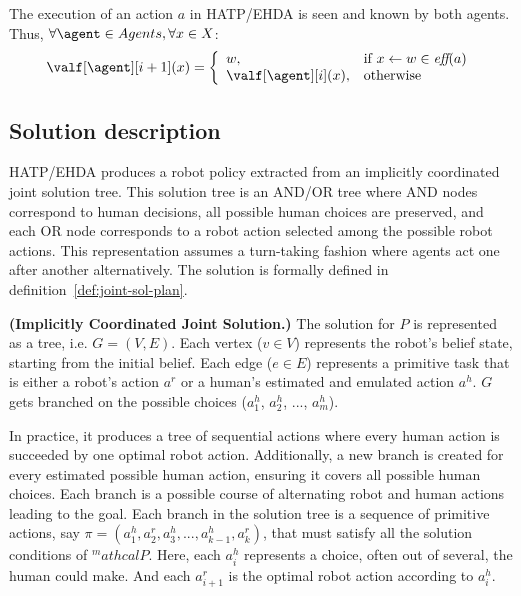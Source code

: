 The execution of an action $a$ in HATP/EHDA is seen and known by both agents. Thus, $\forall \agent \in Agents, \forall x \in X$: 
\begin{equation}
    \valf[\agent][i+1](x) = \left\{ 
    \begin{array}{ll}
        w, & \mbox{if} ~ x \leftarrow w \in \textit{eff}(a)   \\ 
        \valf[\agent][i](x), & \mbox{otherwise}
    \end{array}\right.
\end{equation}


\subsection*{Solution description}

HATP/EHDA produces a robot policy extracted from an implicitly coordinated joint solution tree. This solution tree is an AND/OR tree where AND nodes correspond to human decisions, all possible human choices are preserved, and each OR node corresponds to a robot action selected among the possible robot actions. This representation assumes a turn-taking fashion where agents act one after another alternatively. The solution is formally defined in definition~\ref{def:joint-sol-plan}.

\begin{definition} 
    \label{def:joint-sol-plan}
    \textbf{(Implicitly Coordinated Joint Solution.)} 
    {The solution for $P$ is represented as a tree, i.e. $G=(V,E)$. Each vertex ($v \in V$) represents the robot's belief state, starting from the initial belief. Each edge ($e \in E$) represents a primitive task that is either a robot's action $a^{r}$ or a human's estimated and emulated action $a^{h}$. $G$ gets branched on the possible choices ($a^{h}_1$, $a^{h}_2$, ..., $a^{h}_m$). 
    }  
    \end{definition}
    
In practice, it produces a tree of sequential actions where every human action is succeeded by one optimal robot action. Additionally, a new branch is created for every estimated possible human action, ensuring it covers all possible human choices. Each branch is a possible course of alternating robot and human actions leading to the goal.
Each branch in the solution tree is a sequence of primitive actions, say $\pi=(a_1^h,a_2^r,a_3^h,...,a_{k-1}^h,a_k^r)$, that must satisfy all the solution conditions of $^mathcal{P}$. 
Here, each $a_i^h$ represents a choice, often out of several, the human could make. And each $a_{i+1}^r$ is the optimal robot action according to $a_i^h$.


